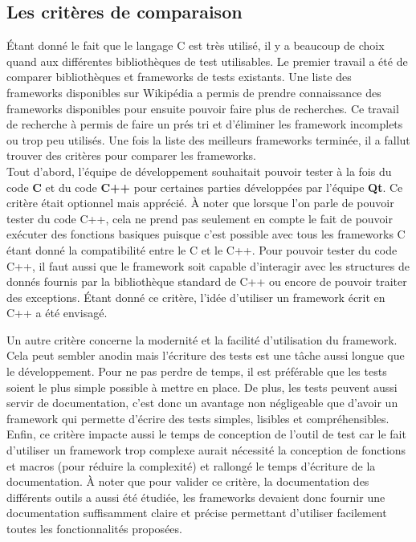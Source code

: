\documentclass[a4paper]{article}
\begin{document}
\subsection{Les critères de comparaison}

Étant donné le fait que le langage C est très utilisé, il y a beaucoup de choix
quand aux différentes bibliothèques de test utilisables. Le premier travail a
été de comparer bibliothèques et frameworks de tests existants. Une liste des
frameworks disponibles sur Wikipédia \cite{enwikiframeworks} a permis de prendre
connaissance des frameworks disponibles pour ensuite pouvoir faire plus de
recherches. Ce travail de recherche à permis de faire un prés tri et d'éliminer
les framework incomplets ou trop peu utilisés. Une fois la liste des meilleurs
frameworks terminée, il a fallut trouver des critères pour comparer les
frameworks. \\

Tout d'abord, l'équipe de développement souhaitait pouvoir tester à la fois du
code \textbf{C} et du code \textbf{C++} pour certaines parties développées par
l'équipe \textbf{Qt}. Ce critère était optionnel mais apprécié. À noter que
lorsque l'on parle de pouvoir tester du code C++, cela ne prend pas seulement en
compte le fait de pouvoir exécuter des fonctions basiques puisque c'est possible
avec tous les frameworks C étant donné la compatibilité entre le C et le C++.
Pour pouvoir tester du code C++, il faut aussi que le framework soit capable
d'interagir avec les structures de donnés fournis par la bibliothèque standard
de C++ ou encore de pouvoir traiter des exceptions. Étant donné ce critère,
l'idée d'utiliser un framework écrit en C++ a été envisagé.

Un autre critère concerne la modernité et la facilité d'utilisation du
framework. Cela peut sembler anodin mais l'écriture des tests est une tâche
aussi longue que le développement. Pour ne pas perdre de temps, il est
préférable que les tests soient le plus simple possible à mettre en place. De
plus, les tests peuvent aussi servir de documentation, c'est donc un avantage
non négligeable que d'avoir un framework qui permette d'écrire des tests
simples, lisibles et compréhensibles. Enfin, ce critère impacte aussi le temps
de conception de l'outil de test car le fait d'utiliser un framework trop
complexe aurait nécessité la conception de fonctions et macros (pour réduire la
complexité) et rallongé le temps d'écriture de la documentation. À noter que
pour valider ce critère, la documentation des différents outils a aussi été
étudiée, les frameworks devaient donc fournir une documentation suffisamment
claire et précise permettant d'utiliser facilement toutes les fonctionnalités
proposées.
\end{document}
